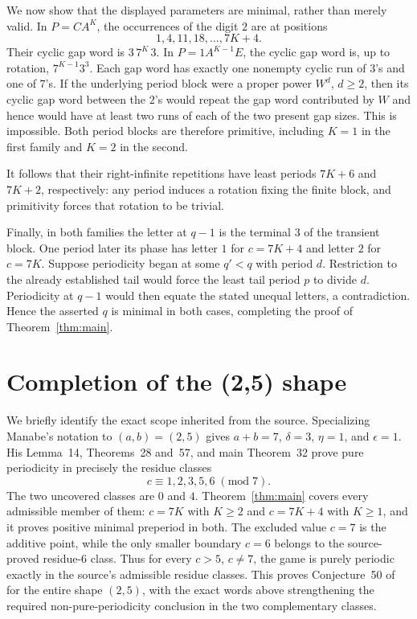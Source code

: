 \documentclass[11pt]{article}
\begin{document}
We now show that the displayed parameters are minimal, rather than merely
valid.  In $P=CA^K$, the occurrences of the digit $2$ are at positions
\[
1,4,11,18,\ldots,7K+4.
\]
Their cyclic gap word is $3\,7^K\,3$.  In $P=1A^{K-1}E$, the cyclic gap
word is, up to rotation, $7^{K-1}3^3$.  Each gap word has exactly one
nonempty cyclic run of $3$'s and one of $7$'s.  If the underlying period
block were a proper power $W^d$, $d\ge2$, then its cyclic gap word between
the $2$'s would repeat the gap word contributed by $W$ and hence would have
at least two runs of each of the two present gap sizes.  This is impossible.
Both period blocks are therefore primitive, including $K=1$ in the first
family and $K=2$ in the second.

It follows that their right-infinite repetitions have least periods
$7K+6$ and $7K+2$, respectively: any period induces a rotation fixing the
finite block, and primitivity forces that rotation to be trivial.

Finally, in both families the letter at $q-1$ is the terminal $3$ of the
transient block.  One period later its phase has letter $1$ for $c=7K+4$
and letter $2$ for $c=7K$.  Suppose periodicity began at some $q'<q$ with
period $d$.  Restriction to the already established tail would force the
least tail period $p$ to divide $d$.  Periodicity at $q-1$ would then equate
the stated unequal letters, a contradiction.  Hence the asserted $q$ is
minimal in both cases, completing the proof of Theorem~\ref{thm:main}.

\section{Completion of the (2,5) shape}

We briefly identify the exact scope inherited from the source.  Specializing
Manabe's notation to $(a,b)=(2,5)$ gives $a+b=7$, $\delta=3$, $\eta=1$,
and $\epsilon=1$.  His Lemma~14, Theorems~28 and~57, and main Theorem~32
prove pure periodicity in precisely the residue classes
\[
 c\equiv1,2,3,5,6\;(\mathrm{mod}\;7).
\]
The two uncovered classes are $0$ and $4$.  Theorem~\ref{thm:main} covers
every admissible member of them: $c=7K$ with $K\ge2$ and $c=7K+4$ with
$K\ge1$, and it proves positive minimal preperiod in both.  The excluded
value $c=7$ is the additive point, while the only smaller boundary $c=6$
belongs to the source-proved residue-$6$ class.  Thus for every $c>5$,
$c\ne7$, the game is purely periodic exactly in the source's admissible
residue classes.  This proves Conjecture~50 of~\cite{Manabe2026} for the
entire shape $(2,5)$, with the exact words above strengthening the required
non-pure-periodicity conclusion in the two complementary classes.
\end{document}
